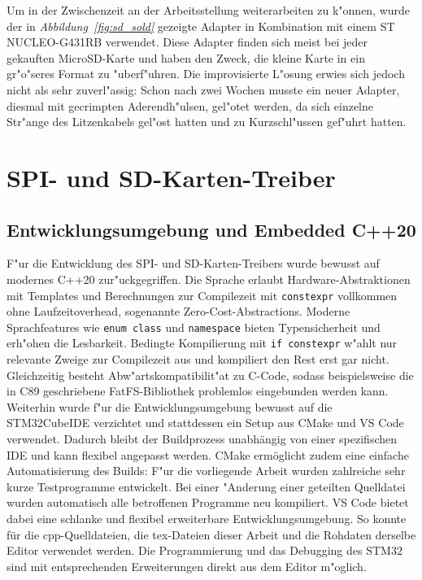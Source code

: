 \documentclass[11pt]{article}
\newcommand*{\fig}[1]{\textit{Abbildung~\ref{#1}}}
\newcommand{\cpp}[1]{\texttt{#1}}
\begin{document}
Um in der Zwischenzeit an der Arbeitsstellung weiterarbeiten zu k"onnen,
wurde der in \fig{fig:sd_sold} gezeigte Adapter in Kombination
mit einem ST NUCLEO-G431RB verwendet. Diese Adapter finden sich meist bei jeder gekauften MicroSD-Karte
und haben den Zweck, die kleine Karte in ein gr"o"seres Format zu "uberf"uhren.
Die improvisierte L"osung erwies sich jedoch nicht als sehr zuverl"assig:
Schon nach zwei Wochen musste ein neuer Adapter, diesmal mit gecrimpten Aderendh"ulsen, gel"otet werden,
da sich einzelne Str"ange des Litzenkabels gel"ost hatten und zu Kurzschl"ussen gef"uhrt hatten.


\section{SPI- und SD-Karten-Treiber} \label{sec:spi} 

\subsection{Entwicklungsumgebung und Embedded C++20}
F"ur die Entwicklung des SPI- und SD-Karten-Treibers wurde bewusst auf modernes C++20 zur"uckgegriffen.
Die Sprache erlaubt Hardware-Abstraktionen mit Templates und Berechnungen zur Compilezeit mit \cpp{constexpr} 
vollkommen ohne Laufzeitoverhead, sogenannte Zero-Cost-Abstractions.
Moderne Sprachfeatures wie \cpp{enum class} und \cpp{namespace} bieten Typensicherheit und erh"ohen die Lesbarkeit.
Bedingte Kompilierung mit \cpp{if constexpr} w"ahlt nur relevante Zweige zur Compilezeit aus und kompiliert den Rest erst gar nicht.
Gleichzeitig besteht Abw"artskompatibilit"at zu C-Code, sodass beispielsweise die in C89 geschriebene
FatFS-Bibliothek problemlos eingebunden werden kann.\\
Weiterhin wurde f"ur die Entwicklungsumgebung bewusst auf die STM32CubeIDE verzichtet und stattdessen ein Setup aus CMake und VS Code verwendet.
Dadurch bleibt der Buildprozess unabhängig von einer spezifischen IDE 
und kann flexibel angepasst werden.
CMake ermöglicht zudem eine einfache Automatisierung des Builds: F"ur die vorliegende
Arbeit wurden zahlreiche sehr kurze Testprogramme entwickelt. Bei einer "Anderung einer
geteilten Quelldatei wurden automatisch alle betroffenen Programme neu kompiliert.
VS Code bietet dabei eine schlanke und flexibel erweiterbare Entwicklungsumgebung.
So konnte für die cpp-Quelldateien, 
die tex-Dateien dieser Arbeit und die Rohdaten 
derselbe Editor verwendet werden.
Die Programmierung und das Debugging des STM32 sind mit entsprechenden Erweiterungen direkt
aus dem Editor m"oglich.
\end{document}
